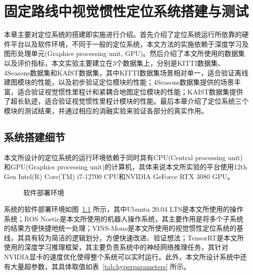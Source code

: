 




\chapter{固定路线中视觉惯性定位系统搭建与测试}

本章主要对定位系统的搭建即实施进行介绍。首先介绍了定位系统运行所依靠的硬件平台以及软件环境，不同于一般的定位系统，本文方法的实施依赖于深度学习及图形处理单元(Graphics processing unit, GPU)。然后介绍了本文所使用的数据集以及评价指标，本文实验主要建立在3个数据集上，分别是KITTI数据集、4Seasons数据集和KAIST数据集，其中KITTI数据集场景相对单一，适合验证离线建图模块的性能，以及初步验证定位模块的性能；4Seasons数据集提供的场景丰富，适合验证视觉惯性里程计和紧耦合地图定位模块的性能；KAIST数据集提供了超长轨迹，适合验证视觉惯性里程计模块的性能。最后本章介绍了定位系统三个模块的测试结果，并通过相应的消融实验来验证各部分的真实作用。

\section{系统搭建细节}

本文所设计的定位系统的运行环境依赖于同时具有CPU(Central processing unit)和GPU(Graphics processing unit)的计算机，具体来说本文所实验的平台使用12th Gen Intel(R) Core(TM) i7-12700 CPU和NVIDIA GeForce RTX 3080 GPU。

\begin{figure}
  \centering
  \caption{软件部署环境}
  \label{fig:software}
\end{figure}

系统的软件部署环境如图~\ref{fig:software} 所示，其中Ubuntu 20.04 LTS是本文所使用的操作系统；ROS Noetic是本文所使用的机器人操作系统，其主要作用是将多个子系统的结果方便快捷地统一处理；VINS-Mono是本文所使用的视觉惯性定位系统的基线，其具有较为简洁的逻辑划分，方便快速改进、验证想法；TensorRT是本文所使用的深度学习推理框架，其主要负责系统中的神经网络推理任务，其针对NVIDIA显卡的速度优化使得整个系统可以实时运行。此外，本文所设计系统中还有大量超参数，其具体取值如表~\ref{tab:hyperparameters} 所示。

